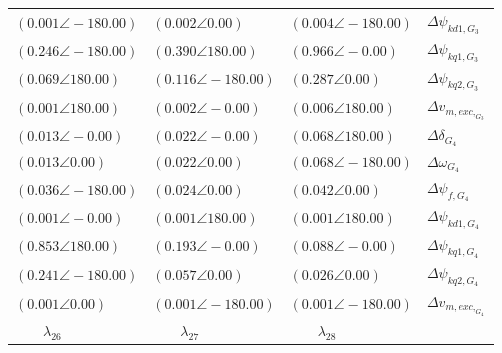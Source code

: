 \begin{tabular}{lll|l}
$(0.001 \angle -180.00)$	& $(0.002 \angle 0.00)$	& $(0.004 \angle -180.00)$	& $\Delta \psi_{kd1,G_3}$ \\ 
$\mathbf{(0.246 \angle -180.00)}$	& $\mathbf{(0.390 \angle 180.00)}$	& $\mathbf{(0.966 \angle -0.00)}$	& $\Delta \psi_{kq1,G_3}$ \\ 
$\mathbf{(0.069 \angle 180.00)}$	& $\mathbf{(0.116 \angle -180.00)}$	& $\mathbf{(0.287 \angle 0.00)}$	& $\Delta \psi_{kq2,G_3}$ \\ 
$(0.001 \angle 180.00)$	& $(0.002 \angle -0.00)$	& $(0.006 \angle 180.00)$	& $\Delta v_{m,exc,_{G_3}}$ \\ 
 \hline 
$(0.013 \angle -0.00)$	& $(0.022 \angle -0.00)$	& $\mathbf{(0.068 \angle 180.00)}$	& $\Delta\delta_{G_4}$ \\ 
$(0.013 \angle 0.00)$	& $(0.022 \angle 0.00)$	& $\mathbf{(0.068 \angle -180.00)}$	& $\Delta\omega_{G_4}$ \\ 
$(0.036 \angle -180.00)$	& $(0.024 \angle 0.00)$	& $(0.042 \angle 0.00)$	& $\Delta \psi_{f,G_4}$ \\ 
$(0.001 \angle -0.00)$	& $(0.001 \angle 180.00)$	& $(0.001 \angle 180.00)$	& $\Delta \psi_{kd1,G_4}$ \\ 
$\mathbf{(0.853 \angle 180.00)}$	& $\mathbf{(0.193 \angle -0.00)}$	& $\mathbf{(0.088 \angle -0.00)}$	& $\Delta \psi_{kq1,G_4}$ \\ 
$\mathbf{(0.241 \angle -180.00)}$	& $\mathbf{(0.057 \angle 0.00)}$	& $(0.026 \angle 0.00)$	& $\Delta \psi_{kq2,G_4}$ \\ 
$(0.001 \angle 0.00)$	& $(0.001 \angle -180.00)$	& $(0.001 \angle -180.00)$	& $\Delta v_{m,exc,_{G_4}}$ \\ 
 \hline 
\hline 
$\qquad\lambda_{26}$	&$\qquad\lambda_{27}$	&$\qquad\lambda_{28}$	&
\end{tabular}

